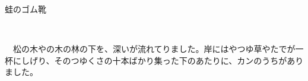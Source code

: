 \documentclass[
a4paper,
fontsize=20pt,
jafontsize=20pt,
book]
{tarticle}
\begin{document}
\fontsize{16pt}{30pt}\selectfont
\rubysetup{(-)} %

蛙のゴム靴\\
\begin{flushright}
\\
\end{flushright}



　松の木やの木の林の下を、深いが流れてりました。岸にはやつゆ草やたでが一杯にしげり、そのつゆくさの十本ばかり集った下のあたりに、カンのうちがありました。
\begin{comment}
　それから、林の中の楢の木の下に、ブン蛙のうちがありました。
　林の向ふのすゝきのかげには、ベン蛙のうちがありました。
　三\ruby{疋}{びき}は年も同じなら大きさも大てい同じ、どれも負けず劣らず生意気で、いたづらものでした。
　ある夏の暮れ方、カン蛙ブン蛙ベン蛙の三疋は、カン蛙の家の前のつめくさの広場に座って、雲見といふことをやって居りました。一体蛙どもは、みんな、夏の雲の峯を見ることが大すきです。じっさいあのまっしろなプクプクした、\ruby{玉髄}{ぎょくずゐ}のやうな、玉あられのやうな、又\ruby{蛋白石}{たんぱくせき}を刻んでこさへた\ruby{葡萄}{ぶだう}の置物のやうな雲の峯は、\ruby{誰}{たれ}の目にも立派に見えますが、蛙どもには殊にそれが見事なのです。\ruby{眺}{なが}めても眺めても\ruby{厭}{あ}きないのです。そのわけは、雲のみねといふものは、どこか蛙の頭の形に\ruby{肖}{に}てゐますし、それから春の蛙の卵に似てゐます。それで日本人ならば、丁度花見とか月見とかいふ\ruby{処}{ところ}を、蛙どもは雲見をやります。
「どうも実に立派だね。だんだんペネタ形になるね。」
「うん。うすい金色だね。永遠の生命を思はせるね。」
「実に僕たちの理想だね。」
　雲のみねはだんだんペネタ形になって参りました。ペネタ形といふのは、蛙どもでは大へん\ruby{高尚}{かうしゃう}なものになってゐます。平たいことなのです。雲の峰はだんだん崩れてあたりはよほどうすくらくなりました。
「この\ruby{頃}{ごろ}、ヘロンの方ではゴム\ruby{靴}{ぐつ}がはやるね。」ヘロンといふのは蛙語です。人間といふことです。
「うん。よくみんなはいてるやうだね。」
「僕たちもほしいもんだな。」
「全くほしいよ。あいつをはいてなら\ruby{粟}{くり}のいがでも何でもこはくないぜ。」
「ほしいもんだなあ。」
「手に入れる工夫はないだらうか。」
「ないわけでもないだらう。たゞ僕たちのはヘロンのとは大きさも型も大分ちがふから\ruby{拵}{こしら}へ直さないと\ruby{駄目}{だめ}だな。」
「うん。それはさうさ。」
　さて雲のみねは全くくづれ、あたりは\ruby{藍}{あゐ}色になりました。そこでベン蛙とブン蛙とは、
「さよならね。」と\ruby{云}{い}ってカン蛙とわかれ、林の下の堰を勇ましく泳いで自分のうちに帰って行きました。


\end{comment}
\end{document}
